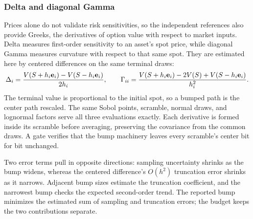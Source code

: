 \subsubsection{Delta and diagonal Gamma}\label{sec:reference-greeks}

Prices alone do not validate risk sensitivities, so the independent references also provide Greeks, the derivatives of option value with respect to market inputs. Delta measures first-order sensitivity to an asset's spot price, while diagonal Gamma measures curvature with respect to that same spot. They are estimated here by centered differences on the same terminal draws:
\[
\Delta_i = \frac{V(S + h_i \mathbf{e}_i) - V(S - h_i \mathbf{e}_i)}{2 h_i},
\qquad
\Gamma_{ii} = \frac{V(S + h_i \mathbf{e}_i) - 2V(S) + V(S - h_i \mathbf{e}_i)}{h_i^2}.
\]
The terminal value is proportional to the initial spot, so a bumped path is the center path rescaled. The same Sobol points, scramble, normal draws, and lognormal factors serve all three evaluations exactly. Each derivative is formed inside its scramble before averaging, preserving the covariance from the common draws. A gate verifies that the bump machinery leaves every scramble's center bit for bit unchanged.

Two error terms pull in opposite directions: sampling uncertainty shrinks as the bump widens, whereas the centered difference's $O(h^2)$ truncation error shrinks as it narrows. Adjacent bump sizes estimate the truncation coefficient, and the narrowest bump checks the expected second-order trend. The reported bump minimizes the estimated sum of sampling and truncation errors; the budget keeps the two contributions separate.
